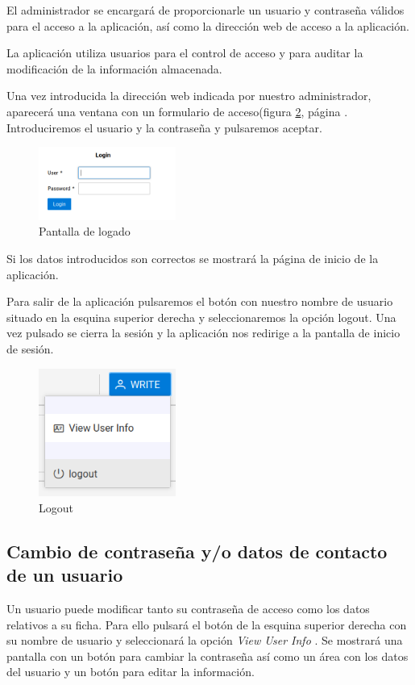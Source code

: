 El administrador se encargará de proporcionarle un usuario y contraseña válidos para el acceso a la aplicación, así como la dirección web de acceso a la aplicación.

La aplicación utiliza usuarios para el control de acceso y para auditar la
modificación de la información almacenada. 

Una vez introducida la dirección web indicada por nuestro administrador, aparecerá una ventana con un formulario de acceso(figura \ref{fig:login}, página \pageref{fig:login}. Introduciremos el usuario y la contraseña y pulsaremos aceptar. 


\begin{figure}[H]
  \centering
  \includegraphics[width=0.40\textwidth]{imaxes/login.png}
  \caption{Pantalla de logado}
  \label{fig:login}
\end{figure}

Si los datos introducidos son correctos se mostrará la página de inicio de la aplicación.

Para salir de la aplicación pulsaremos el botón con nuestro nombre de usuario situado en la esquina superior derecha y seleccionaremos la opción logout. Una vez pulsado se cierra la sesión y la aplicación nos redirige a la pantalla de inicio de sesión.

\begin{figure}[H]
  \centering
  \includegraphics[width=0.40\textwidth]{imaxes/logout.png}
  \caption{Logout}
  \label{fig:login}
\end{figure}


\subsection{Cambio de contraseña y/o datos de contacto de un usuario}
\label{sub:contraseña}
Un usuario puede modificar tanto su contraseña de acceso como los datos relativos a su ficha. Para ello pulsará el botón de la esquina superior derecha con su nombre de usuario y seleccionará la opción \textit{View User Info} .
Se mostrará una pantalla con un botón para cambiar la contraseña así como un área con los datos del usuario y un botón para editar la información.

